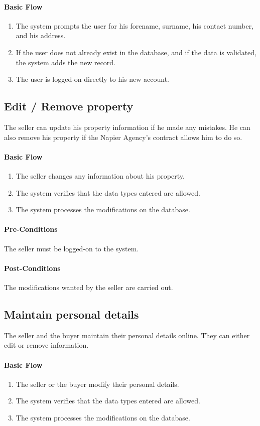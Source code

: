 \documentclass[a4paper,12pt]{article}
\begin{document}
\paragraph{Basic Flow}
\begin{enumerate}
\item The system prompts the user for his forename, surname, his contact number, and his address.
\item If the user does not already exist in the database, and if the data is validated, the system adds the new record.
\item The user is logged-on directly to his new account.
\end{enumerate}

\subsection{Edit / Remove property}
The seller can update his property information if he made any mistakes. He can also remove his property if the Napier Agency's contract allows him to do so.
\paragraph{Basic Flow}
\begin{enumerate}
\item The seller changes any information about his property.
\item The system verifies that the data types entered are allowed.
\item The system processes the modifications on the database.
\end{enumerate}
\paragraph{Pre-Conditions}
The seller must be logged-on to the system.
\paragraph{Post-Conditions}
The modifications wanted by the seller are carried out.

\subsection{Maintain personal details}
The seller and the buyer maintain their personal details online. They can either edit or remove information.
\paragraph{Basic Flow}
\begin{enumerate}
\item The seller or the buyer modify their personal details.
\item The system verifies that the data types entered are allowed.
\item The system processes the modifications on the database.
\end{enumerate}
\end{document}
